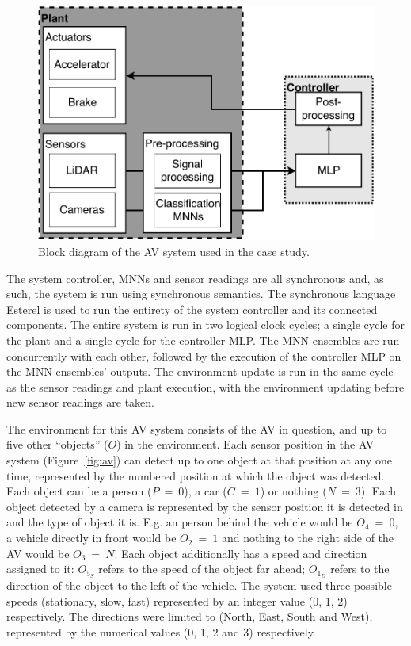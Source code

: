 \begin{figure}[h]
	\centering
	\includegraphics[width=\textwidth]{Content/fig/AV-sys-nenf.pdf}
	\caption{Block diagram of the \ac{AV} system used in the case study. \label{fig:avnenf}}
\end{figure}

The system controller, \acp{MNN} and sensor readings are all synchronous and, as such, the system is run using synchronous semantics.
The synchronous language Esterel is used to run the entirety of the system controller and its connected components.
The entire system is run in two logical clock cycles; a single cycle for the plant and a single cycle for the controller \ac{MLP}.
The \ac{MNN} ensembles are run concurrently with each other, followed by the execution of the controller \ac{MLP} on the \ac{MNN} ensembles' outputs.
The environment update is run in the same cycle as the sensor readings and plant execution, with the environment updating before new sensor readings are taken.

The environment for this \ac{AV} system consists of the \ac{AV} in question, and up to five other ``objects'' ($O$) in the environment.
Each sensor position in the \ac{AV} system (Figure~\ref{fig:av}) can detect up to one object at that position at any one time, represented by the numbered position at which the object was detected.
Each object can be a person ($P~=~0$), a car ($C~=~1$) or nothing ($N~=~3$).
Each object detected by a camera is represented by the sensor position it is detected in and the type of object it is.
E.g. an person behind the vehicle would be $O_{4}~=~0$, a vehicle directly in front would be $O_{2}~=~1$ and nothing to the right side of the \ac{AV} would be $O_{3}~=~N$.
Each object additionally has a speed and direction assigned to it: $O_{5_S}$ refers to the speed of the object far ahead; $O_{1_D}$ refers to the direction of the object to the left of the vehicle.
The system used three possible speeds (stationary, slow, fast) represented by an integer value (0, 1, 2) respectively.
The directions were limited to (North, East, South and West), represented by the numerical values (0, 1, 2 and 3) respectively.

